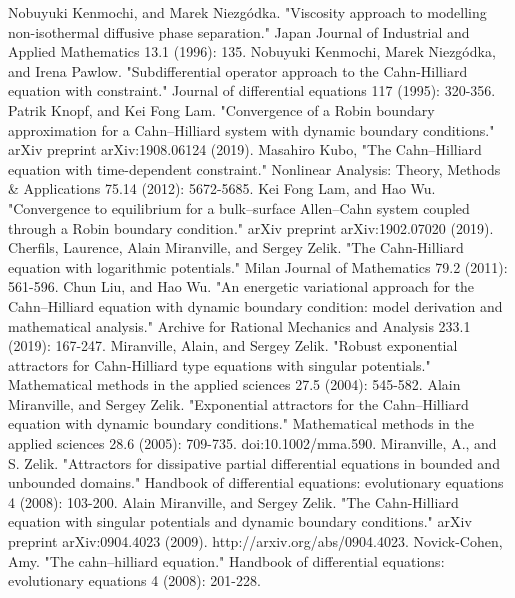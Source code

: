 \documentclass[a4paper]{article}
\begin{document}
\begin{thebibliography}{99}
		Nobuyuki Kenmochi, and Marek Niezgódka. "Viscosity approach to modelling non-isothermal diffusive phase separation." Japan Journal of Industrial and Applied Mathematics 13.1 (1996): 135.
		Nobuyuki Kenmochi, Marek Niezg\'odka, and Irena Pawlow. "Subdifferential operator approach to the Cahn-Hilliard equation with constraint." Journal of differential equations 117 (1995): 320-356.
		Patrik Knopf, and Kei Fong Lam. "Convergence of a Robin boundary approximation for a Cahn--Hilliard system with dynamic boundary conditions." arXiv preprint arXiv:1908.06124 (2019).
		Masahiro Kubo, "The Cahn–Hilliard equation with time-dependent constraint." Nonlinear Analysis: Theory, Methods \& Applications 75.14 (2012): 5672-5685.
		Kei Fong Lam, and Hao Wu. "Convergence to equilibrium for a bulk--surface Allen--Cahn system coupled through a Robin boundary condition." arXiv preprint arXiv:1902.07020 (2019).
		Cherfils, Laurence, Alain Miranville, and Sergey Zelik. "The Cahn-Hilliard equation with logarithmic potentials." Milan Journal of Mathematics 79.2 (2011): 561-596.
		Chun Liu, and Hao Wu. "An energetic variational approach for the Cahn–Hilliard equation with dynamic boundary condition: model derivation and mathematical analysis." Archive for Rational Mechanics and Analysis 233.1 (2019): 167-247.
		Miranville, Alain, and Sergey Zelik. "Robust exponential attractors for Cahn‐Hilliard type equations with singular potentials." Mathematical methods in the applied sciences 27.5 (2004): 545-582.
		Alain Miranville, and Sergey Zelik. "Exponential attractors for the Cahn–Hilliard equation with dynamic boundary conditions." Mathematical methods in the applied sciences 28.6 (2005): 709-735. doi:10.1002/mma.590.
		Miranville, A., and S. Zelik. "Attractors for dissipative partial differential equations in bounded and unbounded domains." Handbook of differential equations: evolutionary equations 4 (2008): 103-200.
		Alain Miranville, and Sergey Zelik. "The Cahn-Hilliard equation with singular potentials and dynamic boundary conditions." arXiv preprint arXiv:0904.4023 (2009).
		http://arxiv.org/abs/0904.4023.
		Novick-Cohen, Amy. "The cahn–hilliard equation." Handbook of differential equations: evolutionary equations 4 (2008): 201-228.

\end{thebibliography}
\end{document}
